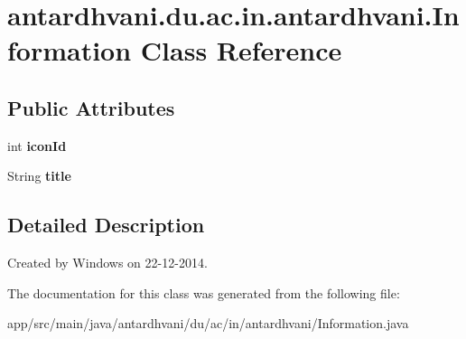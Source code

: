 \hypertarget{classantardhvani_1_1du_1_1ac_1_1in_1_1antardhvani_1_1_information}{}\section{antardhvani.\+du.\+ac.\+in.\+antardhvani.\+Information Class Reference}
\label{classantardhvani_1_1du_1_1ac_1_1in_1_1antardhvani_1_1_information}
\subsection*{Public Attributes}
\begin{DoxyCompactItemize}
\item 
\hypertarget{classantardhvani_1_1du_1_1ac_1_1in_1_1antardhvani_1_1_information_a8f8f8bd74052c31ea39d07f89bd521d9}{}int {\bfseries icon\+Id}\label{classantardhvani_1_1du_1_1ac_1_1in_1_1antardhvani_1_1_information_a8f8f8bd74052c31ea39d07f89bd521d9}

\item 
\hypertarget{classantardhvani_1_1du_1_1ac_1_1in_1_1antardhvani_1_1_information_ac957bf40d8be93540aaca0dcc76ebda3}{}String {\bfseries title}\label{classantardhvani_1_1du_1_1ac_1_1in_1_1antardhvani_1_1_information_ac957bf40d8be93540aaca0dcc76ebda3}

\end{DoxyCompactItemize}


\subsection{Detailed Description}
Created by Windows on 22-\/12-\/2014. 

The documentation for this class was generated from the following file\+:\begin{DoxyCompactItemize}
\item 
app/src/main/java/antardhvani/du/ac/in/antardhvani/Information.\+java\end{DoxyCompactItemize}
